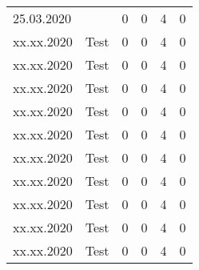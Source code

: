 \begin{landscape}
\begin{longtable}[c]{lp{10cm}rrrr}
	25.03.2020 
	& 
	& 0 %
	& 0 %
	& 4 %
	& 0\\ %
	
	
	xx.xx.2020 
	& Test
	& 0 %
	& 0 %
	& 4 %
	& 0\\ %
	
	xx.xx.2020 
	& Test
	& 0 %
	& 0 %
	& 4 %
	& 0\\ %

	xx.xx.2020 
	& Test
	& 0 %
	& 0 %
	& 4 %
	& 0\\ %

	xx.xx.2020 
	& Test
	& 0 %
	& 0 %
	& 4 %
	& 0\\ %

	xx.xx.2020 
	& Test
	& 0 %
	& 0 %
	& 4 %
	& 0\\ %

	xx.xx.2020 
	& Test
	& 0 %
	& 0 %
	& 4 %
	& 0\\ %
	
	xx.xx.2020 
	& Test
	& 0 %
	& 0 %
	& 4 %
	& 0\\ %

	xx.xx.2020 
	& Test
	& 0 %
	& 0 %
	& 4 %
	& 0\\ %

	xx.xx.2020 
	& Test
	& 0 %
	& 0 %
	& 4 %
	& 0\\ %

	xx.xx.2020 
	& Test
	& 0 %
	& 0 %
	& 4 %
	& 0\\ %
	
\end{longtable}


\end{landscape}
